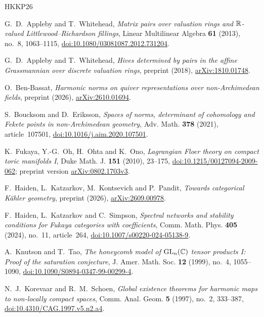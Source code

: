 \begin{thebibliography}{HKKP26}

G.~D.~Appleby and T.~Whitehead, \emph{Matrix pairs over valuation rings
and $\mathbb R$-valued Littlewood--Richardson fillings}, Linear Multilinear
Algebra \textbf{61} (2013), no.~8, 1063--1115,
\href{https://doi.org/10.1080/03081087.2012.731204}{doi:10.1080/03081087.2012.731204}.

G.~D.~Appleby and T.~Whitehead, \emph{Hives determined by pairs in
the affine Grassmannian over discrete valuation rings}, preprint (2018),
\href{https://arxiv.org/abs/1810.01748}{arXiv:1810.01748}.

O.~Ben-Bassat, \emph{Harmonic norms on quiver representations over
non-Archimedean fields}, preprint (2026),
\href{https://arxiv.org/abs/2610.01694}{arXiv:2610.01694}.

S.~Boucksom and D.~Eriksson, \emph{Spaces of norms, determinant of cohomology
and Fekete points in non-Archimedean geometry}, Adv. Math. \textbf{378}
(2021), article~107501, \href{https://doi.org/10.1016/j.aim.2020.107501}{doi:10.1016/j.aim.2020.107501}.

K.~Fukaya, Y.-G.~Oh, H.~Ohta and K.~Ono, \emph{Lagrangian Floer theory
on compact toric manifolds I}, Duke Math. J. \textbf{151} (2010), 23--175,
\href{https://doi.org/10.1215/00127094-2009-062}{doi:10.1215/00127094-2009-062};
preprint version \href{https://arxiv.org/abs/0802.1703v3}{arXiv:0802.1703v3}.

F.~Haiden, L.~Katzarkov, M.~Kontsevich and P.~Pandit,
\emph{Towards categorical K\"ahler geometry}, preprint (2026),
\href{https://arxiv.org/abs/2609.00978}{arXiv:2609.00978}.

F.~Haiden, L.~Katzarkov and C.~Simpson,
\emph{Spectral networks and stability conditions for Fukaya categories
with coefficients}, Comm. Math. Phys. \textbf{405} (2024), no.~11,
article~264, \href{https://doi.org/10.1007/s00220-024-05138-9}{doi:10.1007/s00220-024-05138-9}.

A.~Knutson and T.~Tao, \emph{The honeycomb model of $\mathrm{GL}_n(\mathbb C)$
tensor products I: Proof of the saturation conjecture},
J. Amer. Math. Soc. \textbf{12} (1999), no.~4, 1055--1090,
\href{https://doi.org/10.1090/S0894-0347-99-00299-4}{doi:10.1090/S0894-0347-99-00299-4}.

N.~J.~Korevaar and R.~M.~Schoen, \emph{Global existence theorems for
harmonic maps to non-locally compact spaces}, Comm. Anal. Geom.
\textbf{5} (1997), no.~2, 333--387,
\href{https://doi.org/10.4310/CAG.1997.v5.n2.a4}{doi:10.4310/CAG.1997.v5.n2.a4}.


\end{thebibliography}
